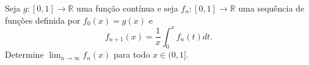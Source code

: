 Seja \(g\colon [0,1]\to \mathbb{R}\) uma função contínua e seja \(f_{n}\colon [0,1]\to \mathbb{R}\) uma sequência de funções definida por \(f_{0}(x)=g(x)\) e
\[f_{n+1}(x)=\frac{1}{x}\int_{0}^{x}f_{n}(t)dt.\] Determine \(\lim_{n\to \infty}f_{n}(x)\) para todo \(x\in (0,1]\).
